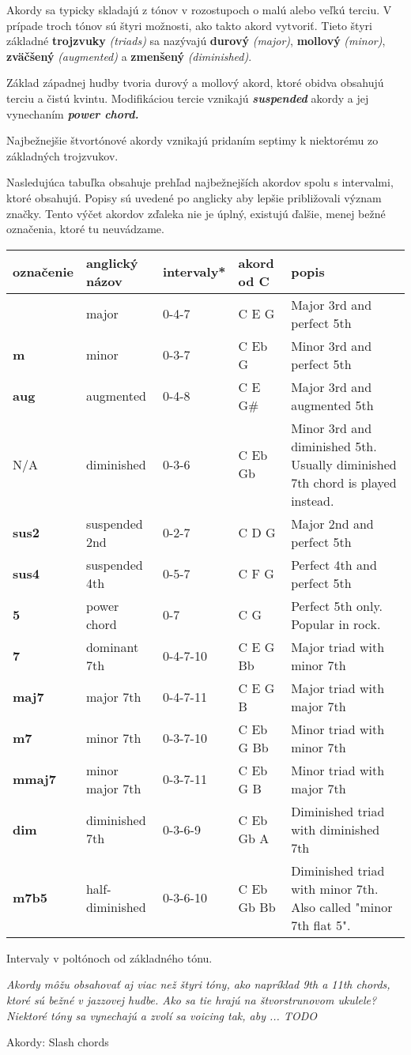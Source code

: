 Akordy sa typicky skladajú z tónov v rozostupoch o malú alebo veľkú terciu. V prípade troch tónov sú štyri možnosti,
ako takto akord vytvoriť. Tieto štyri základné \textbf{trojzvuky} \textit{(triads)} sa nazývajú
\textbf{durový} \textit{(major)}, \textbf{mollový} \textit{(minor)}, \textbf{zväčšený} \textit{(augmented)}
a \textbf{zmenšený} \textit{(diminished)}.

Základ západnej hudby tvoria durový a mollový akord, ktoré obidva obsahujú terciu a čistú kvintu. Modifikáciou
tercie vznikajú \textbf{\textit{suspended}} akordy a jej vynechaním \textbf{\textit{power chord.}}

Najbežnejšie štvortónové akordy vznikajú pridaním septimy k niektorému zo základných trojzvukov.

Nasledujúca tabuľka obsahuje prehľad najbežnejších akordov spolu s intervalmi, ktoré obsahujú. Popisy sú uvedené
po anglicky aby lepšie približovali význam značky. Tento výčet akordov zďaleka nie je úplný, existujú ďalšie, menej
bežné označenia, ktoré tu neuvádzame.

\begin{tabularx}{\linewidth}{ l l l l X }
    označenie & anglický názov & intervaly* & akord od C & popis \\
    \hline
      & major & 0-4-7 & C E G & Major 3rd and perfect 5th \\
    \textbf{m} & minor & 0-3-7 & C Eb G & Minor 3rd and perfect 5th \\
    \textbf{aug} & augmented & 0-4-8 & C E G\# & Major 3rd and augmented 5th \\
    N/A & diminished & 0-3-6 & C Eb Gb & Minor 3rd and diminished 5th. Usually diminished 7th chord is played instead. \\
    \hline
    \textbf{sus2} & suspended 2nd & 0-2-7 & C D G & Major 2nd and perfect 5th  \\
    \textbf{sus4} & suspended 4th & 0-5-7 & C F G & Perfect 4th and perfect 5th \\
    \textbf{5} & power chord & 0-7 & C G & Perfect 5th only. Popular in rock. \\
    \hline
    \textbf{7} & dominant 7th &  0-4-7-10 & C E G Bb & Major triad with minor 7th  \\
    \textbf{maj7} & major 7th &  0-4-7-11 & C E G B & Major triad with major 7th \\
    \textbf{m7} & minor 7th &  0-3-7-10 & C Eb G Bb & Minor triad with minor 7th \\
    \textbf{mmaj7} & minor major 7th &  0-3-7-11 & C Eb G B & Minor triad with major 7th \\
    \textbf{dim} & diminished 7th &  0-3-6-9 & C Eb Gb A & Diminished triad with diminished 7th \\
    \textbf{m7b5} & half-diminished &  0-3-6-10 & C Eb Gb Bb & Diminished triad with minor 7th. Also called "minor 7th flat 5". \\
\end{tabularx}
{\smaller *Intervaly v poltónoch od základného tónu.}

\bigskip

\textit{%
Akordy môžu obsahovať aj viac než štyri tóny, ako napríklad 9th a 11th chords, ktoré sú bežné v jazzovej hudbe.
Ako sa tie hrajú na štvorstrunovom ukulele? Niektoré tóny sa vynechajú a zvolí sa voicing tak, aby ... TODO
}


Akordy: Slash chords


\endgroup